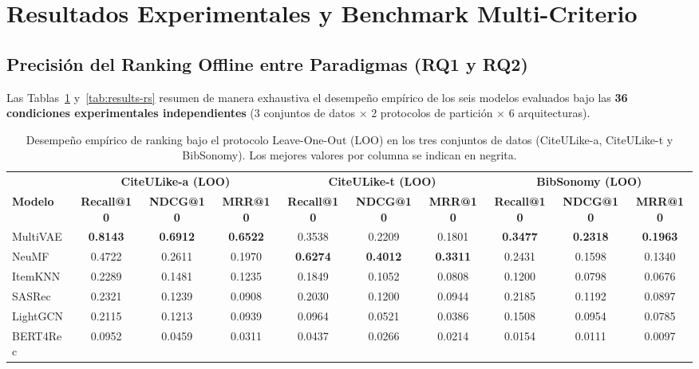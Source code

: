 \documentclass[journal]{IEEEtran}
\makeatletter
\newcommand{\at}[1]{@#1}
\makeatother
\begin{document}
\section{Resultados Experimentales y Benchmark Multi-Criterio}
\label{sec:resultados}

\subsection{Precisión del Ranking Offline entre Paradigmas (RQ1 y RQ2)}
Las Tablas~\ref{tab:results-loo} y~\ref{tab:results-rs} resumen de manera exhaustiva el desempeño empírico de los seis modelos evaluados bajo las \textbf{36 condiciones experimentales independientes} (3 conjuntos de datos $\times$ 2 protocolos de partición $\times$ 6 arquitecturas).

\begin{table}[t]
\centering
\caption{Desempeño empírico de ranking bajo el protocolo Leave-One-Out (LOO) en los tres conjuntos de datos (CiteULike-a, CiteULike-t y BibSonomy). Los mejores valores por columna se indican en negrita.}
\label{tab:results-loo}
\footnotesize
\setlength{\tabcolsep}{3.5pt}
\begin{tabular}{lccccccccc}
\toprule
& \multicolumn{3}{c}{\textbf{CiteULike-a (LOO)}} & \multicolumn{3}{c}{\textbf{CiteULike-t (LOO)}} & \multicolumn{3}{c}{\textbf{BibSonomy (LOO)}} \\
\cmidrule(lr){2-4} \cmidrule(lr){5-7} \cmidrule(lr){8-10}
\textbf{Modelo} & \textbf{Recall\at{10}} & \textbf{NDCG\at{10}} & \textbf{MRR\at{10}} & \textbf{Recall\at{10}} & \textbf{NDCG\at{10}} & \textbf{MRR\at{10}} & \textbf{Recall\at{10}} & \textbf{NDCG\at{10}} & \textbf{MRR\at{10}} \\
\midrule
MultiVAE & \textbf{0.8143} & \textbf{0.6912} & \textbf{0.6522} & 0.3538 & 0.2209 & 0.1801 & \textbf{0.3477} & \textbf{0.2318} & \textbf{0.1963} \\
NeuMF    & 0.4722 & 0.2611 & 0.1970 & \textbf{0.6274} & \textbf{0.4012} & \textbf{0.3311} & 0.2431 & 0.1598 & 0.1340 \\
ItemKNN  & 0.2289 & 0.1481 & 0.1235 & 0.1849 & 0.1052 & 0.0808 & 0.1200 & 0.0798 & 0.0676 \\
SASRec   & 0.2321 & 0.1239 & 0.0908 & 0.2030 & 0.1200 & 0.0944 & 0.2185 & 0.1192 & 0.0897 \\
LightGCN & 0.2115 & 0.1213 & 0.0939 & 0.0964 & 0.0521 & 0.0386 & 0.1508 & 0.0954 & 0.0785 \\
BERT4Rec & 0.0952 & 0.0459 & 0.0311 & 0.0437 & 0.0266 & 0.0214 & 0.0154 & 0.0111 & 0.0097 \\
\bottomrule
\end{tabular}
\end{table}
\end{document}
